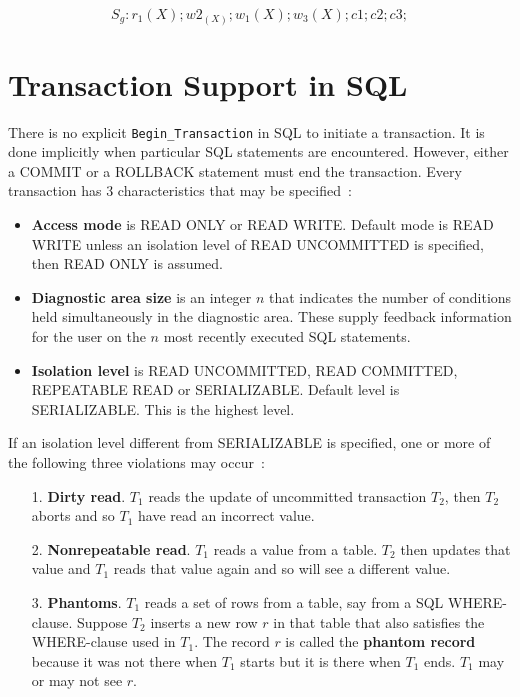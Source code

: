 $$S_g: r_1(X); w2_(X); w_1(X); w_3(X); c1; c2; c3;$$


\section{Transaction Support in SQL}
There is no explicit \texttt{Begin\_Transaction} in SQL to initiate a transaction. It is done implicitly when particular SQL statements are encountered. However, either a COMMIT or a ROLLBACK statement must end the transaction. Every transaction has 3 characteristics that may be specified~:

\begin{itemize}
    \item \textbf{Access mode} is READ ONLY or READ WRITE. Default mode is READ WRITE unless an isolation level of READ UNCOMMITTED is specified, then READ ONLY is assumed.
    \item \textbf{Diagnostic area size} is an integer $n$ that indicates the number of conditions held simultaneously in the diagnostic area. These supply feedback information for the user on the $n$ most recently executed SQL statements.
    \item \textbf{Isolation level} is READ UNCOMMITTED, READ COMMITTED, REPEATABLE READ or SERIALIZABLE. Default level is SERIALIZABLE. This is the highest level.
\end{itemize}

\begin{samepage}

If an isolation level different from SERIALIZABLE is specified, one or more of the following three violations may occur~:

\begin{itemize}
    \item[1.] \textbf{Dirty read}. $T_1$ reads the update of uncommitted transaction $T_2$, then $T_2$ aborts and so $T_1$ have read an incorrect value.
    \item[2.] \textbf{Nonrepeatable read}. $T_1$ reads a value from a table. $T_2$ then updates that value and $T_1$ reads that value again and so will see a different value.
    \item[3.] \textbf{Phantoms}. $T_1$ reads a set of rows from a table, say from a SQL WHERE-clause. Suppose $T_2$ inserts a new row $r$ in that table that also satisfies the WHERE-clause used in $T_1$. The record $r$ is called the \textbf{phantom record} because it was not there when $T_1$ starts but it is there when $T_1$ ends. $T_1$ may or may not see $r$.
\end{itemize}
\end{samepage}

